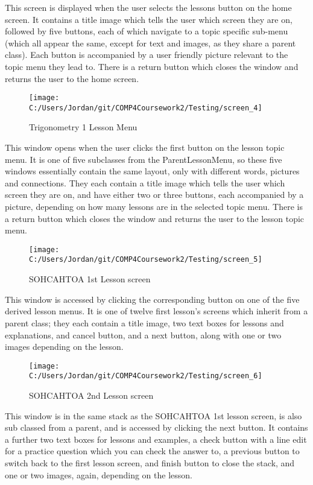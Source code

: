 This screen is displayed when the user selects the lessons button on the home screen. It contains a title image which tells the user which screen they are on, followed by five buttons, each of which navigate to a topic specific sub-menu (which all appear the same, except for text and images, as they share a parent class). Each button is accompanied by a user friendly picture relevant to the topic menu they lead to. There is a return button which closes the window and returns the user to the home screen.

\begin{figure}[H]
    \label{fig: Second Screen}\caption{Trigonometry 1 Lesson Menu}
    \texttt{[image: C:/Users/Jordan/git/COMP4Coursework2/Testing/screen\_4]}
\end{figure}

This window opens when the user clicks the first button on the lesson topic menu. It is one of five subclasses from the ParentLessonMenu, so these five windows essentially contain the same layout, only with different words, pictures and connections. They each contain a title image which tells the user which screen they are on, and have either two or three buttons, each accompanied by a picture, depending on how many lessons are in the selected topic menu. There is a return button which closes the window and returns the user to the lesson topic menu.

\begin{figure}[H]
    \label{fig: Second Screen}\caption{SOHCAHTOA 1st Lesson screen}
    \texttt{[image: C:/Users/Jordan/git/COMP4Coursework2/Testing/screen\_5]}
\end{figure}

This window is accessed by clicking the corresponding button on one of the five derived lesson menus. It is one of twelve first lesson's screens which inherit from a parent class; they each contain a title image, two text boxes for lessons and explanations, and cancel button, and a next button, along with one or two images depending on the lesson.

\begin{figure}[H]
    \label{fig: Second Screen}\caption{SOHCAHTOA 2nd Lesson screen}
    \texttt{[image: C:/Users/Jordan/git/COMP4Coursework2/Testing/screen\_6]}
\end{figure}

This window is in the same stack as the SOHCAHTOA 1st lesson screen, is also sub classed from a parent, and is accessed by clicking the next button. It contains a further two text boxes for lessons and examples, a check button with a line edit for a practice question which you can check the answer to, a previous button to switch back to the first lesson screen, and finish button to close the stack, and one or two images, again, depending on the lesson.

